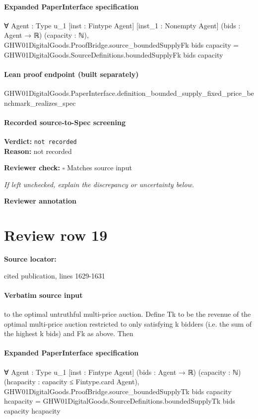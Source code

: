 \documentclass[10pt]{article}
\newcommand{\reviewerbox}{%
  \par\noindent\fbox{\parbox{0.96\linewidth}{\rule{0pt}{0.38in}}}\par
}
\newcommand{\reviewmatch}[1]{%
  \par\noindent\textbf{Reviewer check:} $\square$\; #1\par
  \noindent\emph{If left unchecked, explain the discrepancy or uncertainty below.}\par
}
\begin{document}
\paragraph{Expanded PaperInterface specification}
\begin{ReviewVerbatim}
∀ {Agent : Type u_1} [inst : Fintype Agent] [inst_1 : Nonempty Agent] (bids : Agent → ℝ) (capacity : ℕ),
  GHW01DigitalGoods.ProofBridge.source_boundedSupplyFk bids capacity =
    GHW01DigitalGoods.SourceDefinitions.boundedSupplyFk bids capacity
\end{ReviewVerbatim}

\paragraph{Lean proof endpoint (built separately)}\begin{ReviewVerbatim}
GHW01DigitalGoods.PaperInterface.definition_bounded_supply_fixed_price_benchmark_realizes_spec
\end{ReviewVerbatim}

\paragraph{Recorded source-to-Spec screening}
\textbf{Verdict:} \texttt{not recorded}
\\
\textbf{Reason:} not recorded
\reviewmatch{Matches source input}
\noindent\textbf{Reviewer annotation}\par
\reviewerbox
\clearpage
\hypertarget{source-claim-804fa85d702dba6f}{}
\section*{Review row 19}
\textbf{Source locator:} {\footnotesize\raggedright cited publication, lines 1629-\allowbreak{}1631\par}
\paragraph{Verbatim source input}
\begin{ReviewVerbatim}
to the optimal untruthful multi-price auction. Define
Tk to be the revenue of the optimal multi-price auction restricted to only satisfying k bidders (i.e. the
sum of the highest k bids) and Fk as above. Then
\end{ReviewVerbatim}


\paragraph{Expanded PaperInterface specification}
\begin{ReviewVerbatim}
∀ {Agent : Type u_1} [inst : Fintype Agent] (bids : Agent → ℝ) (capacity : ℕ)
  (hcapacity : capacity ≤ Fintype.card Agent),
  GHW01DigitalGoods.ProofBridge.source_boundedSupplyTk bids capacity hcapacity =
    GHW01DigitalGoods.SourceDefinitions.boundedSupplyTk bids capacity hcapacity
\end{ReviewVerbatim}
\end{document}
